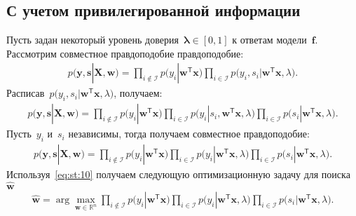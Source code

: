 \documentclass[12pt, twoside]{article}
\numberwithin{equation}{section}
\begin{document}
\subsection{С учетом привилегированной информации}
Пусть задан некоторый уровень доверия~$\bm{\lambda}\in[0,1]$ к ответам модели~$\textbf{f}$. Рассмотрим совместное правдоподобие правдоподобие:
\[
\label{eq:st:8}
\begin{aligned}
p\bigr(\textbf{y}, \textbf{s}|\textbf{X}, \textbf{w}\bigr)=\prod_{i\not\in \mathcal{I}}p\bigr(y_i|\textbf{w}^{\mathsf{T}}\textbf{x}\bigr)\prod_{i\in \mathcal{I}}p\bigr(y_i, s_i|\textbf{w}^{\mathsf{T}}\textbf{x}, \lambda\bigr).
\end{aligned}
\]
Расписав~$p\bigr(y_i, s_i|\textbf{w}^{\mathsf{T}}\textbf{x}, \lambda\bigr)$, получаем:
\[
\label{eq:st:9}
\begin{aligned}
p\bigr(\textbf{y}, \textbf{s}|\textbf{X}, \textbf{w}\bigr)=\prod_{i\not\in \mathcal{I}}p\bigr(y_i|\textbf{w}^{\mathsf{T}}\textbf{x}\bigr)\prod_{i\in \mathcal{I}}p\bigr(y_i|s_i, \textbf{w}^{\mathsf{T}}\textbf{x}, \lambda\bigr)\prod_{i\in \mathcal{I}}p\bigr(s_i|\textbf{w}^{\mathsf{T}}\textbf{x}, \lambda\bigr).
\end{aligned}
\]
Пусть~$y_i$ и~$s_i$ независимы, тогда получаем совместное правдоподобие:
\[
\label{eq:st:10}
\begin{aligned}
p\bigr(\textbf{y}, \textbf{s}|\textbf{X}, \textbf{w}\bigr)=\prod_{i\not\in \mathcal{I}}p\bigr(y_i|\textbf{w}^{\mathsf{T}}\textbf{x}\bigr)\prod_{i\in \mathcal{I}}p\bigr(y_i|\textbf{w}^{\mathsf{T}}\textbf{x}, \lambda\bigr)\prod_{i\in \mathcal{I}}p\bigr(s_i|\textbf{w}^{\mathsf{T}}\textbf{x}, \lambda\bigr).
\end{aligned}
\]
Используя~\eqref{eq:st:10} получаем следующую оптимизационную задачу для поиска~$\hat{\textbf{w}}$
\[
\label{eq:st:11}
\begin{aligned}
\hat{\textbf{w}} = \arg\max_{\textbf{w}\in \mathbb{R}^{n}}\prod_{i\not\in \mathcal{I}}p\bigr(y_i|\textbf{w}^{\mathsf{T}}\textbf{x}\bigr)\prod_{i\in \mathcal{I}}p\bigr(y_i|\textbf{w}^{\mathsf{T}}\textbf{x}, \lambda\bigr)\prod_{i\in \mathcal{I}}p\bigr(s_i|\textbf{w}^{\mathsf{T}}\textbf{x}, \lambda\bigr).
\end{aligned}
\]
\end{document}
